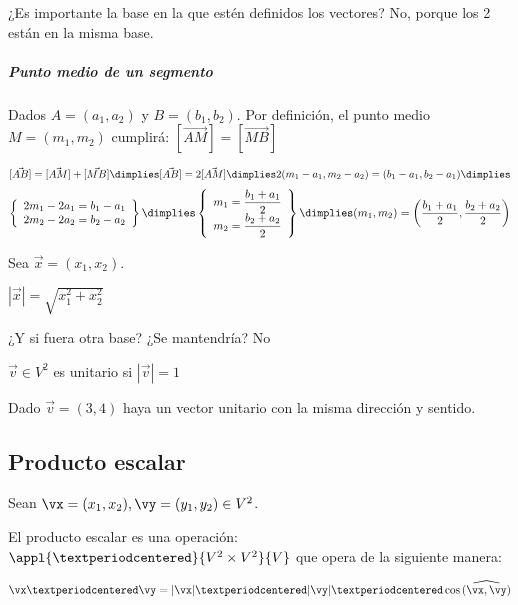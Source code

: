 \obs ¿Es importante la base en la que estén definidos los vectores? No, porque los 2 están en la misma base.

\subparagraph{Punto medio de un segmento} Dados $A=(a_1,a_2)$ y $B=(b_1,b_2)$. Por definición, el punto medio $M=(m_1,m_2)$ cumplirá: $[\vec{AM}] = [\vec{MB}]$

\[
[\vec{AB}] = [\vec{AM}] + [\vec{MB}]\dimplies
[\vec{AB}] = 2[\vec{AM}] \dimplies 
2(m_1-a_1,m_2-a_2) = (b_1-a_1,b_2-a_1) \dimplies
\]
\[
\left\{
	\begin{array}{c}
	2m_1-2a_1 = b_1-a_1\\
	2m_2-2a_2 = b_2-a_2
	\end{array}
\right\}\dimplies
\left\{
	\begin{array}{c}
	m_1 = \displaystyle\frac{b_1+a_1}{2}\\
	m_2 = \displaystyle\frac{b_2+a_2}{2}
	\end{array}
\right\}
\dimplies (m_1,m_2) = \left(\frac{b_1+a_1}{2},\frac{b_2+a_2}{2}\right)
\]


\begin{prop} 
Sea $\vec{x} = (x_1,x_2)$.

$|\vec{x}| = \sqrt{x_1^2+x_2^2}$

\obs ¿Y si fuera otra base? ¿Se mantendría? No

\end{prop}


\begin{defn} $\vec{v}\in V^2$ es unitario si $|\vec{v}|=1$
\end{defn}

\begin{problem}
Dado $\vec{v}=(3,4)$ haya un vector unitario con la misma dirección y sentido.
\solution

\end{problem}

\subsection{Producto escalar}

\begin{defn}
Sean $\vx=(x_1,x_2),\vy=(y_1,y_2)\in V^2$. 

El producto escalar es una operación: $\appl{·}{ V^2\times V^2}{ V}$ que opera de la siguiente manera: 

\[\vx·\vy = |\vx|·|\vy|·\cos{\widehat{(\vx,\vy)}}\]
\end{defn}

